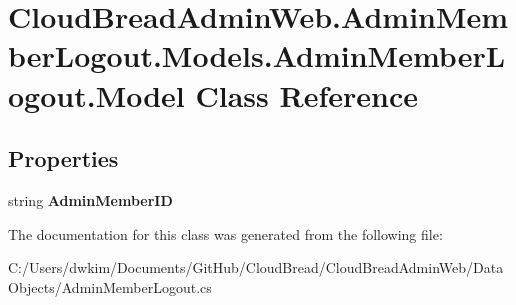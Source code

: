 \hypertarget{a00161}{}\section{Cloud\+Bread\+Admin\+Web.\+Admin\+Member\+Logout.\+Models.\+Admin\+Member\+Logout.\+Model Class Reference}
\label{a00161}
\subsection*{Properties}
\begin{DoxyCompactItemize}
\item 
string {\bfseries Admin\+Member\+ID}\hypertarget{a00161_a8b918f836ea00a42ad40528eddb85d0c}{}\label{a00161_a8b918f836ea00a42ad40528eddb85d0c}

\end{DoxyCompactItemize}


The documentation for this class was generated from the following file\+:\begin{DoxyCompactItemize}
\item 
C\+:/\+Users/dwkim/\+Documents/\+Git\+Hub/\+Cloud\+Bread/\+Cloud\+Bread\+Admin\+Web/\+Data\+Objects/Admin\+Member\+Logout.\+cs\end{DoxyCompactItemize}
